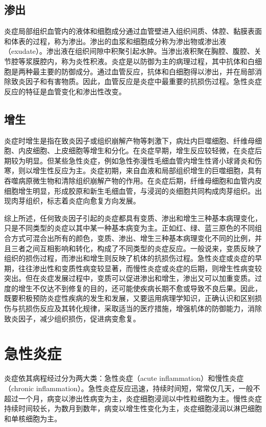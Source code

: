 \subsection{渗出}

炎症局部组织血管内的液体和细胞成分通过血管壁进入组织间质、体腔、黏膜表面和体表的过程，称为渗出。渗出的血浆和细胞成分称为渗出物或渗出液（exudate）。渗出液在组织间隙中积聚引起水肿。当渗出液积聚在胸腔、腹腔、关节腔等浆膜腔内，称为炎性积液。炎症是以防御为主的病理过程，其中抗体和白细胞是两种最主要的防御成分。通过血管反应，抗体和白细胞得以渗出，并在局部消除致炎因子和有害物质。因此，血管反应是炎症中最重要的抗损伤过程。急性炎症反应的特征是血管变化和渗出性改变。

\subsection{增生}

炎症时增生是指在致炎因子或组织崩解产物等刺激下，病灶内巨噬细胞、纤维母细胞、内皮细胞、上皮细胞等增生和分化。在炎症早期，增生反应较轻微，在炎症后期较为明显。但某些急性炎症，例如急性弥漫性毛细血管内增生性肾小球肾炎和伤寒，则以增生性反应为主。炎症初期，来自血液和局部组织增生的巨噬细胞，具有吞噬病原微生物和清除组织崩解产物的作用。在炎症后期，纤维母细胞和血管内皮细胞增生明显，形成胶原和新生毛细血管，与浸润的炎细胞共同构成肉芽组织。出现肉芽组织，标志着炎症向愈复方向发展。

综上所述，任何致炎因子引起的炎症都具有变质、渗出和增生三种基本病理变化，只是不同类型的炎症以其中某一种基本病变为主。正如红、绿、蓝三原色的不同组合方式可混合出所有的颜色，变质、渗出、增生三种基本病理变化不同的比例，并且三者之间互相影响和转化，构成了不同类型的炎症反应。一般说来，变质反映了组织的损伤过程，而渗出和增生则反映了机体的抗损伤过程。急性炎症或炎症的早期，往往渗出性和变质性病变较显著，而慢性炎症或炎症的后期，则增生性病变较突出。但在炎症发展过程中，变质可以促进渗出和增生，渗出又可以加重变质。过度的增生不仅达不到修复的目的，还可能使疾病长期不愈或导致不良后果。因此，既要积极预防炎症性疾病的发生和发展，又要运用病理学知识，正确认识和区别损伤与抗损伤反应及其转化规律，采取适当的医疗措施，增强机体的防御能力，消除致炎因子，减少组织损伤，促进病变愈复。

\section{急性炎症}

炎症依其病程经过分为两大类：急性炎症（acute
inflammation）和慢性炎症（chronic
inflammation）。急性炎症反应迅速，持续时间短，常常仅几天，一般不超过一个月，病变以渗出性病变为主，炎症细胞浸润以中性粒细胞为主。慢性炎症持续时间较长，为数月到数年，病变以增生性变化为主，炎症细胞浸润以淋巴细胞和单核细胞为主。

